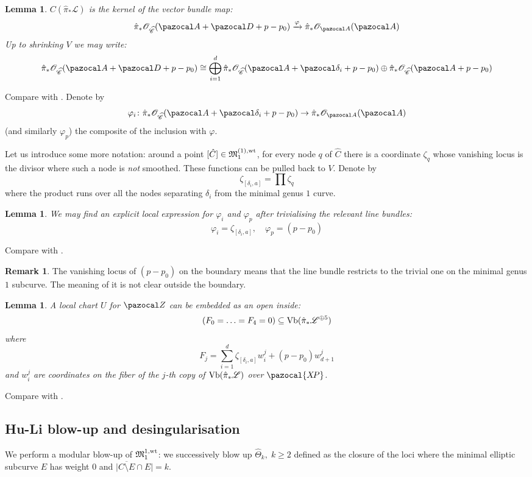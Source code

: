 \documentclass[11pt]{amsart}
\newcommand{\OO}{\mathcal O}
\renewcommand{\to}{\rightarrow}
\newcommand{\A}{\pazocal A}
\newcommand{\XP}{\pazocal{X\!P}}
\newcommand{\hC}{\widehat{\mathcal C}}
\newcommand{\Z}{\pazocal Z}
\newcommand{\MM}{\mathfrak M}
\theoremstyle{plain}
\newtheorem{lem}[thm]{Lemma}
\theoremstyle{definition}
\newtheorem{remark}[thm]{Remark}
\begin{document}
\begin{lem}
$C(\hat\pi_*\mathcal L)$ is the kernel of the vector bundle map:
\[ \hat\pi_*\OO_{\hC}(\A+\pazocal D+p-p_0)\xrightarrow{\varphi}\hat\pi_*\OO_{\A}(\A)\]
Up to shrinking $V$ we may write:
\[\hat\pi_*\OO_{\hC}(\A+\pazocal D+p-p_0)\cong\bigoplus_{i=1}^d\hat\pi_*\OO_{\hC}(\A+\pazocal \delta_i+p-p_0)\oplus\hat\pi_*\OO_{\hC}(\A+p-p_0)\]
\end{lem}
Compare with \cite[Lemma 4.10]{HL}. Denote by \[\varphi_i\colon\hat\pi_*\OO_{\hC}(\A+\pazocal \delta_i+p-p_0)\to\hat\pi_*\OO_{\A}(\A)\] (and similarly $\varphi_p$) the composite of the inclusion with $\varphi$.

Let us introduce some more notation: around a point $[\hat C]\in\MM_1^{(1),\rm{wt}}$, for every node $q$ of $\hat C$ there is a coordinate $\zeta_q$ whose vanishing locus is the divisor where such a node is \emph{not} smoothed. These functions can be pulled back to $V$. Denote by \[\zeta_{[\delta_i,a]}=\prod\zeta_q\]
where the product runs over all the nodes separating $\delta_i$ from the minimal genus $1$ curve.
 
\begin{lem}
We may find an explicit local expression for $\varphi_i$ and $\varphi_p$ after trivialising the relevant line bundles:
\[\varphi_i=\zeta_{[\delta_i,a]}, \quad \varphi_p=(p-p_0)\]
\end{lem}
Compare with \cite[Proposition 4.13]{HL}.
\begin{remark}
The vanishing locus of $(p-p_0)$ on the boundary means that the line bundle restricts to the trivial one on the minimal genus $1$ subcurve. The meaning of it is not clear outside the boundary.
\end{remark}

\begin{lem}\label{lem:equations}
A local chart $U$ for $\Z$ can be embedded as an open inside:
\[ (F_0=\ldots=F_4=0)\subseteq \rm{Vb}(\hat{\pi}_*\mathcal L^{\oplus 5}) \]
where
\[ F_j=\sum_{i=1}^d \zeta_{[\delta_i,a]}w_i^j+(p-p_0)w_{d+1}^j \]
and $w_i^j$ are coordinates on the fiber of the $j$-th copy of $\rm{Vb}(\hat{\pi}_*\mathcal L)$ over $\XP$.
\end{lem}
Compare with \cite[Theorems 2.17-19]{HL}.

\subsection{Hu-Li blow-up and desingularisation}
We perform a modular blow-up of $\MM_1^{1,\rm{wt}}$: we successively blow up $\hat\Theta_k, \;k\geq 2$  defined as the closure of the loci where the minimal elliptic subcurve $E$ has weight $0$ and $\lvert\overline{C\setminus E}\cap E\rvert=k.$
\end{document}
